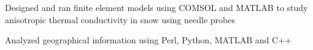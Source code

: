 \begin{job}

  \begin{accomplishments}
    \item Designed and ran finite element models using COMSOL and MATLAB to study
    anisotropic thermal conductivity in snow using needle probes
    \item Analyzed geographical information using Perl, Python, MATLAB and C++
  \end{accomplishments}
\end{job}
